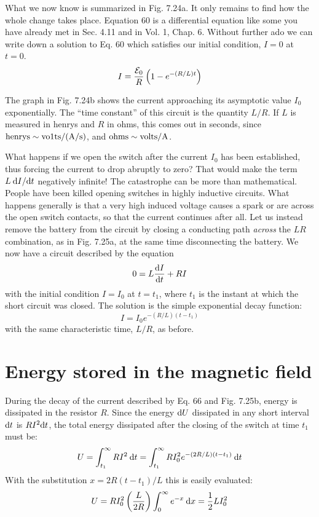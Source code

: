 What we now know is summarized in Fig. 7.24a. It only remains
to find how the whole change takes place. Equation 60 is a differential 
equation like some you have already met in Sec. 4.11 and in
Vol. 1, Chap. 6. Without further ado we can write down a solution
to Eq. 60 which satisfies our initial condition, $I = 0$ at $t = 0$.
\begin{equation}
  I = \frac{\mathcal{E}_0}{R}\left(1-e^{-(R/L)t}\right)
\end{equation}

The graph in Fig. 7.24b shows the current approaching its asymptotic
value $I_0$ exponentially. The ``time constant'' of this circuit is
the quantity $L/R$. If $L$ is measured in henrys and $R$ in ohms, this
comes out in seconds, since $\textup{henrys} \sim \textup{vo1ts}/ (\textup{A}/\textup{s})$, and
$\textup{ohms} \sim \textup{volts}/\textup{A}$.

What happens if we open the switch after the current $I_0$ has been
established, thus forcing the current to drop abruptly to zero? That
would make the term $L\: \textup{d} I/\textup{d} t$ negatively infinite! The catastrophe
can be more than mathematical. People have been killed opening
switches in highly inductive circuits. What happens generally is that
a very high induced voltage causes a spark or are across the open
switch contacts, so that the current continues after all. Let us instead
remove the battery from the circuit by closing a conducting
path \emph{across} the $LR$ combination, as in Fig. 7.25a, at the same time 
disconnecting the battery. We now have a circuit described by the
equation
\begin{equation}
  0 = L \frac{\textup{d} I}{\textup{d} t} +RI
\end{equation}
with the initial condition $I = I_0$ at $t = t_1$, where $t_1$ is the instant at
which the short circuit was closed. The solution is the simple exponential
decay function:
\begin{equation}
  I = I_0 e^{-(R/L)(t-t_1)}
\end{equation}
with the same characteristic time, $L/R$, as before.

\section{Energy stored in the magnetic field}
During the decay of the current described by Eq. 66 and Fig. 7.25b,
energy is dissipated in the resistor $R$. Since the energy $\textup{d} U$ dissipated
in any short interval $\textup{d} t$ is $RI^2 \textup{d} t$, the total energy dissipated after
the closing of the switch at time $t_1$ must be:
\begin{equation}
  U = \int_{t_1}^\infty RI^2\:\textup{d} t
    = \int_{t_1}^\infty RI_0^2e^{-(2R/L)(t-t_1)}\:\textup{d} t
\end{equation}
With the substitution $x = 2R(t - t_1)/L$ this is easily evaluated:
\begin{equation}
  U = RI_0^2\left(\frac{L}{2R}\right)\int_0^\infty e^{-x}\:\textup{d} x = \frac{1}{2}LI_0^2
\end{equation}

